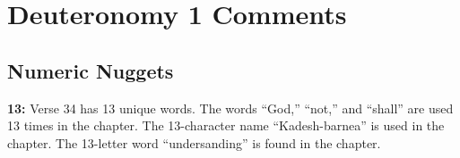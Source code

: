\section{Deuteronomy 1 Comments}

\subsection{Numeric Nuggets}
\textbf{13: } Verse 34 has 13 unique words. The words ``God,'' ``not,'' and ``shall'' are used 13 times in the chapter.  The 13-character name ``Kadesh-barnea'' is used in the chapter. The 13-letter word ``undersanding'' is found in the chapter.